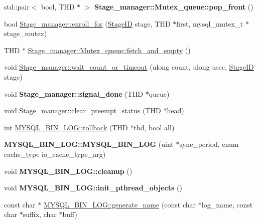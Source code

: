 \begin{DoxyCompactItemize}
std\+::pair$<$ bool, T\+HD $\ast$ $>$ {\bfseries Stage\+\_\+manager\+::\+Mutex\+\_\+queue\+::pop\+\_\+front} ()
\item 
bool \mbox{\hyperlink{group__Binary__Log_ga71a83004e5774879856189f84d00094f}{Stage\+\_\+manager\+::enroll\+\_\+for}} (\mbox{\hyperlink{classStage__manager_a28879837525f3786d4bcb6f330f4ac69}{Stage\+ID}} stage, T\+HD $\ast$first, mysql\+\_\+mutex\+\_\+t $\ast$stage\+\_\+mutex)
\item 
T\+HD $\ast$ \mbox{\hyperlink{group__Binary__Log_ga254675ae9d8f6f0a7b48d7520ab16eea}{Stage\+\_\+manager\+::\+Mutex\+\_\+queue\+::fetch\+\_\+and\+\_\+empty}} ()
\item 
void \mbox{\hyperlink{group__Binary__Log_gaa85432b55b5d1d84283e83c4399ad524}{Stage\+\_\+manager\+::wait\+\_\+count\+\_\+or\+\_\+timeout}} (ulong count, ulong usec, \mbox{\hyperlink{classStage__manager_a28879837525f3786d4bcb6f330f4ac69}{Stage\+ID}} stage)
\item 
\mbox{\label{group__Binary__Log_ga8ad5d70cddeb0156c9b3cea377466858}} 
void {\bfseries Stage\+\_\+manager\+::signal\+\_\+done} (T\+HD $\ast$queue)
\item 
void \mbox{\hyperlink{group__Binary__Log_gad3389586ace2de50ee7606d7acc98849}{Stage\+\_\+manager\+::clear\+\_\+preempt\+\_\+status}} (T\+HD $\ast$head)
\item 
int \mbox{\hyperlink{group__Binary__Log_ga9590d29210bd03fce1b8f9effc7c2d2a}{M\+Y\+S\+Q\+L\+\_\+\+B\+I\+N\+\_\+\+L\+O\+G\+::rollback}} (T\+HD $\ast$thd, bool all)
\item 
\mbox{\label{group__Binary__Log_ga527779639a0c96124be599b029657813}} 
{\bfseries M\+Y\+S\+Q\+L\+\_\+\+B\+I\+N\+\_\+\+L\+O\+G\+::\+M\+Y\+S\+Q\+L\+\_\+\+B\+I\+N\+\_\+\+L\+OG} (uint $\ast$sync\+\_\+period, enum cache\+\_\+type io\+\_\+cache\+\_\+type\+\_\+arg)
\item 
\mbox{\label{group__Binary__Log_ga2d8c70fe2db7fc6a5ffba006997e9064}} 
void {\bfseries M\+Y\+S\+Q\+L\+\_\+\+B\+I\+N\+\_\+\+L\+O\+G\+::cleanup} ()
\item 
\mbox{\label{group__Binary__Log_ga38e419bec25df519f933787e11e0050e}} 
void {\bfseries M\+Y\+S\+Q\+L\+\_\+\+B\+I\+N\+\_\+\+L\+O\+G\+::init\+\_\+pthread\+\_\+objects} ()
\item 
const char $\ast$ \mbox{\hyperlink{group__Binary__Log_gabcd5b380680e537bdec0f093a8f2e3d6}{M\+Y\+S\+Q\+L\+\_\+\+B\+I\+N\+\_\+\+L\+O\+G\+::generate\+\_\+name}} (const char $\ast$log\+\_\+name, const char $\ast$suffix, char $\ast$buff)

\end{DoxyCompactItemize}
